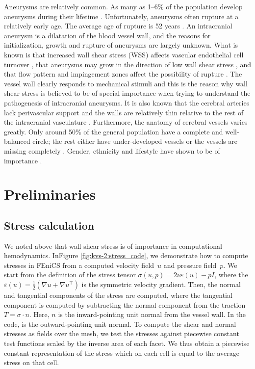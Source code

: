 Aneurysms are relatively common. As many as 1--6\% of the population
develop aneurysms during their
lifetime \citep{Weir2002}. Unfortunately, aneurysms often rupture at a
relatively early age. The average age of rupture is 52
years \citep{Humphrey2001}. An intracranial aneurysm is a dilatation
of the blood vessel wall, and the reasons for initialization, growth
and rupture of aneurysms are largely unknown.  What is known is that
increased wall shear stress (WSS) affects vascular endothelial cell
turnover \citep{DAVIESREMUZZIGORDONEtAl1986}, that aneurysms may grow \pagebreak in the direction of low wall shear stress \citep{BousselRayzMcCullochEtAl2008}, and that flow pattern and impingement zones affect the possibility of
rupture \citep{CebralCastroBurgessEtAl2005}. The vessel wall clearly
responds to mechanical stimuli and this is the reason why wall shear
stress is believed to be of special importance when trying to
understand the pathogenesis of intracranial aneurysms. It is also
known that the cerebral arteries lack perivascular support and the
walls are relatively thin relative to the rest of the intracranial
vasculature \citep{Humphrey2001,Stehbens1975}.  Furthermore, the
anatomy of cerebral vessels varies greatly. Only around 50\% of the
general population have a complete and well-balanced circle; the rest
either have under-developed vessels or the vessels are missing
completely \citep{Fung1984}. Gender, ethnicity and lifestyle have
shown to be of
importance \citep{MhurchuAndersonJamrozikEtAl2001,LongstrethNelsonKoepsellEtAl1994,KongableLanzinoGermansonEtAl1996}.

\section{Preliminaries}

\subsection{Stress calculation}

We noted above that wall shear stress is of importance in
computational hemodynamics. In\break Figure \ref{fig:kvs-2:stress_code}, we
demonstrate how to compute stresses in FEniCS from a computed velocity
field~$u$ and pressure field~$p$. We start from the definition of the
stress tensor $\sigma(u,p) = 2 \nu \varepsilon (u) - p I$, where the
$\varepsilon(u) = \frac{1}{2}(\nabla u + \nabla u^{\top})$ is the symmetric
velocity gradient. Then, the normal and tangential components of the
stress are computed, where the tangential component is computed by
subtracting the normal component from the traction $T = \sigma \cdot
n$. Here, $n$ is the inward-pointing unit normal from the vessel
wall. In the code,  is the outward-pointing unit normal. To
compute the shear and normal stresses as fields over the mesh, we test
the stresses against piecewise constant test functions scaled by the
inverse area of each facet. We thus obtain a piecewise constant
representation of the stress which on each cell is equal to the
average stress on that cell.

